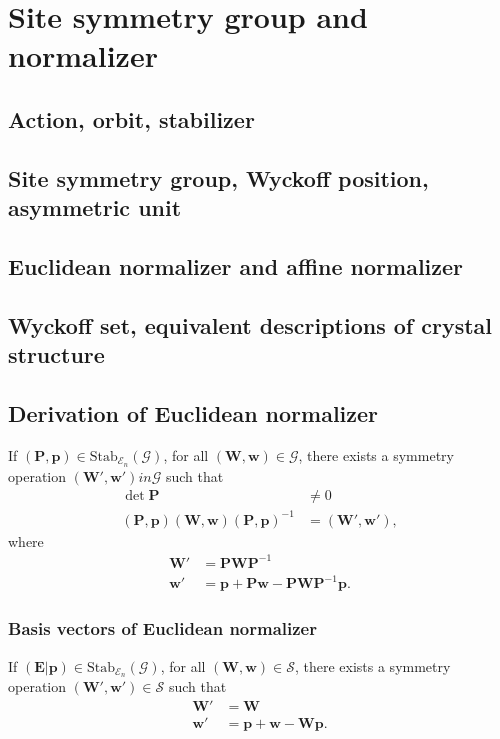 \section{\label{sec:normalizer}Site symmetry group and normalizer}

\subsection{Action, orbit, stabilizer}

\subsection{Site symmetry group, Wyckoff position, asymmetric unit}

\subsection{Euclidean normalizer and affine normalizer}

\subsection{Wyckoff set, equivalent descriptions of crystal structure}

\subsection{Derivation of Euclidean normalizer}

If $( \bm{P}, \bm{p} ) \in \mathrm{Stab}_{\mathcal{E}_{n}}(\mathcal{G})$, for all $(\bm{W}, \bm{w}) \in \mathcal{G}$, there exists a symmetry operation $(\bm{W}', \bm{w}') in \mathcal{G}$ such that
\begin{align}
    \det \bm{P} &\neq 0 \\
    (\bm{P}, \bm{p}) (\bm{W}, \bm{w}) (\bm{P}, \bm{p})^{-1} &= (\bm{W}', \bm{w}'),
\end{align}
where
\begin{align}
  \bm{W}' &= \bm{P} \bm{W} \bm{P}^{-1} \\
  \bm{w}' &= \bm{p} + \bm{Pw} - \bm{PW}\bm{P}^{-1}\bm{p}.
\end{align}

\subsubsection{Basis vectors of Euclidean normalizer}

If $( \bm{E} | \bm{p} ) \in \mathrm{Stab}_{\mathcal{E}_{n}}(\mathcal{G}) $, for all $(\bm{W}, \bm{w} ) \in \mathcal{S}$, there exists a symmetry operation $(\bm{W}', \bm{w}' ) \in \mathcal{S}$ such that
\begin{align}
  \bm{W}' &= \bm{W} \\
  \bm{w}' &= \bm{p} + \bm{w} - \bm{Wp}.
\end{align}

